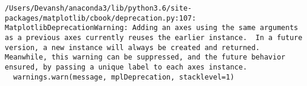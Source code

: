 \documentclass[11pt]{article}
\begin{document}
    \begin{Verbatim}[commandchars=\\\{\}]
/Users/Devansh/anaconda3/lib/python3.6/site-packages/matplotlib/cbook/deprecation.py:107: MatplotlibDeprecationWarning: Adding an axes using the same arguments as a previous axes currently reuses the earlier instance.  In a future version, a new instance will always be created and returned.  Meanwhile, this warning can be suppressed, and the future behavior ensured, by passing a unique label to each axes instance.
  warnings.warn(message, mplDeprecation, stacklevel=1)

    \end{Verbatim}

    \begin{center}
    \end{center}
    { \hspace*{\fill} \\}
    
    \begin{center}
    \end{center}
    { \hspace*{\fill} \\}
    
    \begin{center}
    \end{center}
    { \hspace*{\fill} \\}
    
    \begin{center}
    \end{center}
    { \hspace*{\fill} \\}
    
    \begin{center}
    \end{center}
    { \hspace*{\fill} \\}
    
    \begin{center}
    \end{center}
    { \hspace*{\fill} \\}
    
\end{document}
